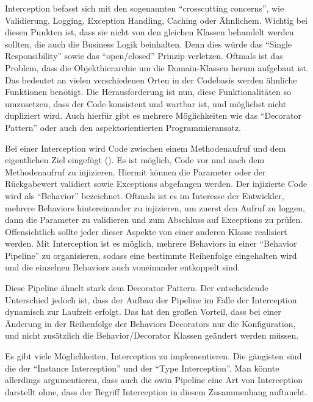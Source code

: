 

Interception befasst sich mit den sogenannten \enquote{crosscutting concerns}, wie \zB Validierung, Logging, Exception Handling, Caching oder Ähnlichem. Wichtig bei diesen Punkten ist, dass sie nicht von den gleichen Klassen behandelt werden sollten, die auch die Business Logik beinhalten. Denn dies würde das \enquote{Single Responsibility} sowie das \enquote{open/closed} Prinzip verletzen. Oftmals ist das Problem, dass die Objekthierarchie um die Domain-Klassen herum aufgebaut ist. Das bedeutet an vielen verschiedenen Orten in der Codebasis werden ähnliche Funktionen benötigt. Die Herausforderung ist nun, diese Funktionalitäten so umzusetzen, dass der Code konsistent und wartbar ist, und möglichst nicht dupliziert wird. Auch hierfür gibt es mehrere Möglichkeiten wie \zB das \enquote{Decorator Pattern} oder auch den aspektorientierten Programmieransatz.

Bei einer Interception wird Code zwischen einem Methodenaufruf und dem eigentlichen Ziel eingefügt (). Es ist möglich, Code vor und nach dem Methodenaufruf zu injizieren. Hiermit können die Parameter oder der Rückgabewert validiert sowie Exceptions abgefangen werden. Der injizierte Code wird als \enquote{Behavior} bezeichnet. Oftmals ist es im Interesse der Entwickler, mehrere Behaviors hintereinander zu injizieren, um \zB zuerst den Aufruf zu loggen, dann die Parameter zu validieren und zum Abschluss auf Exceptions zu prüfen. Offensichtlich sollte jeder dieser Aspekte von einer anderen Klasse realisiert werden. Mit Interception ist es möglich, mehrere Behaviors in einer \enquote{Behavior Pipeline} zu organisieren, sodass eine bestimmte Reihenfolge eingehalten wird und die einzelnen Behaviors auch voneinander entkoppelt sind.


Diese Pipeline ähnelt stark dem Decorator Pattern. Der entscheidende Unterschied jedoch ist, dass der Aufbau der Pipeline im Falle der Interception dynamisch zur Laufzeit erfolgt. Das hat den großen Vorteil, dass bei einer Änderung in der Reihenfolge der Behaviors \bzw Decorators nur die Konfiguration, und nicht zusätzlich die Behavior/Decorator Klassen geändert werden müssen.

Es gibt viele Möglichkeiten, Interception zu implementieren. Die gängisten sind die der \enquote{Instance Interception} und der \enquote{Type Interception}. Man könnte allerdings argumentieren, dass auch die \gls{owin} Pipeline eine Art von Interception darstellt ohne, dass der Begriff Interception in diesem Zusammenhang auftaucht.

